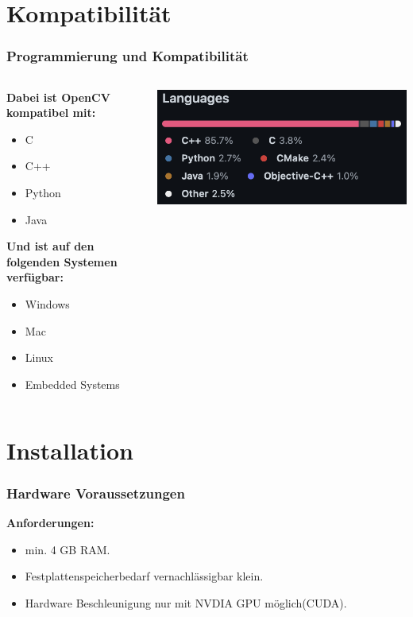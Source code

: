 \documentclass{beamer}
\begin{document}
\section{Kompatibilität}
\begin{frame} \frametitle{Programmierung und Kompatibilität}
\begin{columns}
\begin{column}{0.5\textwidth}
			\textbf{Dabei ist OpenCV kompatibel mit:}
			\begin{itemize}
				\item C
				\item C++
				\item Python
				\item Java
			\end{itemize}
		\textbf{Und ist auf den folgenden Systemen verfügbar:}
		\begin{itemize}
			\item Windows
			\item Mac
			\item Linux
			\item Embedded Systems
		\end{itemize}
	\end{column}


	\begin{column}{0.5\textwidth}
			\centering
			\includegraphics[width=\textwidth]{Bilder/CodeBase.png}
	\end{column}
\end{columns}	
\end{frame}





\section{Installation}
\begin{frame} \frametitle{Hardware Voraussetzungen}
	\textbf{Anforderungen: }
	\begin{itemize}
		\item  min. 4 GB RAM.
		\item Festplattenspeicherbedarf vernachlässigbar klein.  
		\item Hardware Beschleunigung nur mit NVDIA GPU möglich(CUDA).
	\end{itemize}
\end{frame}
\end{document}

